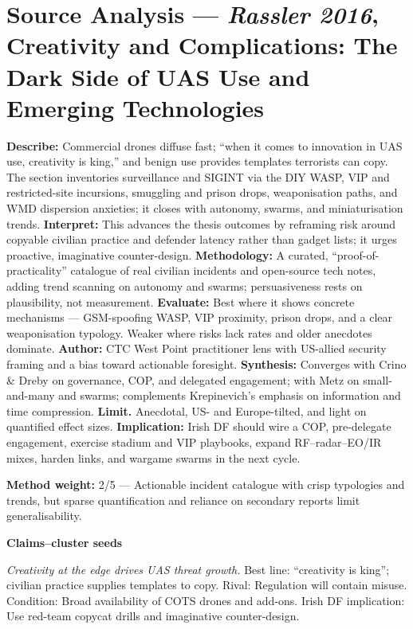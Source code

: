 \section*{Source Analysis — \textit{Rassler 2016}, Creativity and Complications: The Dark Side of UAS Use and Emerging Technologies}
\textbf{Describe:} Commercial drones diffuse fast; “when it comes to innovation in UAS use, creativity is king,” and benign use provides templates terrorists can copy. The section inventories surveillance and SIGINT via the DIY WASP, VIP and restricted-site incursions, smuggling and prison drops, weaponisation paths, and WMD dispersion anxieties; it closes with autonomy, swarms, and miniaturisation trends.
\textbf{Interpret:} This advances the thesis outcomes by reframing risk around copyable civilian practice and defender latency rather than gadget lists; it urges proactive, imaginative counter-design.
\textbf{Methodology:} A curated, “proof-of-practicality” catalogue of real civilian incidents and open-source tech notes, adding trend scanning on autonomy and swarms; persuasiveness rests on plausibility, not measurement.
\textbf{Evaluate:} Best where it shows concrete mechanisms — GSM-spoofing WASP, VIP proximity, prison drops, and a clear weaponisation typology. Weaker where risks lack rates and older anecdotes dominate.
\textbf{Author:} CTC West Point practitioner lens with US-allied security framing and a bias toward actionable foresight.
\textbf{Synthesis:} Converges with Crino \& Dreby on governance, COP, and delegated engagement; with Metz on small-and-many and swarms; complements Krepinevich’s emphasis on information and time compression.
\textbf{Limit.} Anecdotal, US- and Europe-tilted, and light on quantified effect sizes.
\textbf{Implication:} Irish DF should wire a COP, pre-delegate engagement, exercise stadium and VIP playbooks, expand RF–radar–EO/IR mixes, harden links, and wargame swarms in the next cycle.

\textbf{Method weight:} 2/5 — Actionable incident catalogue with crisp typologies and trends, but sparse quantification and reliance on secondary reports limit generalisability.

\textbf{Claims–cluster seeds}

\textit{Creativity at the edge drives UAS threat growth.} Best line: “creativity is king”; civilian practice supplies templates to copy. Rival: Regulation will contain misuse. Condition: Broad availability of COTS drones and add-ons. Irish DF implication: Use red-team copycat drills and imaginative counter-design.

